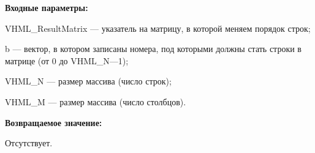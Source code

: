 \textbf{Входные параметры:}
 
VHML\_ResultMatrix --- указатель на матрицу, в которой меняем порядок строк;
 
b --- вектор, в котором записаны номера, под которыми должны стать строки в матрице (от 0 до VHML\_N---1);
 
VHML\_N --- размер массива (число строк);
 
VHML\_M --- размер массива (число столбцов).

\textbf{Возвращаемое значение:}

Отсутствует.